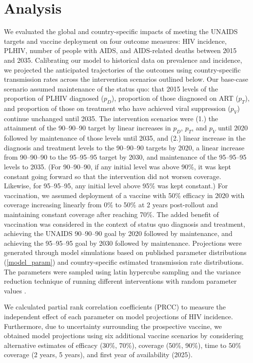 \documentclass[11pt]{article}
\begin{document}
\section{Analysis}
We evaluated the global and country-specific impacts of meeting the
UNAIDS targets and vaccine deployment on four outcome measures: HIV
incidence, PLHIV, number of people with AIDS, and AIDS-related deaths
between 2015 and 2035. Calibrating our model to historical data on
prevalence and incidence, we projected the anticipated trajectories of
the outcomes using country-specific transmission rates across the
intervention scenarios outlined below.  Our base-case scenario assumed
maintenance of the status quo: that 2015 levels of the proportion of
PLHIV diagnosed ($p_{D}$), proportion of those diagnosed on ART
($p_{T}$), and proportion of those on treatment who have achieved
viral suppression ($p_{V}$) continue unchanged until 2035.  The
intervention scenarios were (1.) the attainment of the 90--90--90
target by linear increases in $p_{D}$, $p_{T}$, and $p_{V}$ until 2020
followed by maintenance of those levels until 2035, and (2.) linear
increase in the diagnosis and treatment levels to the 90--90--90
targets by 2020, a linear increase from 90--90--90 to the 95--95--95
target by 2030, and maintenance of the 95--95--95 levels to 2035. (For
90--90--90, if any initial level was above 90\%, it was kept constant
going forward so that the intervention did not worsen coverage.
Likewise, for 95--95--95, any initial level above 95\% was kept
constant.)  For vaccination, we assumed deployment of a vaccine with
50\% efficacy in 2020 with coverage increasing linearly from 0\% to
50\% at 2 years post-rollout and maintaining constant coverage after
reaching 70\%. The added benefit of vaccination was considered in the
context of status quo diagnosis and treatment, achieving the UNAIDS
90–90–90 goal by 2020 followed by maintenance, and achieving the
95–95–95 goal by 2030 followed by maintenance.  Projections were
generated through model simulations based on published parameter
distributions (\autoref{model_param}) and country-specific estimated
transmission rate distributions. The parameters were sampled using
latin hypercube sampling \cite{} and the variance reduction technique
of running different interventions with random parameter values
\cite{}.

We calculated partial rank correlation coefficients (PRCC) to measure
the independent effect of each parameter on model projections of HIV
incidence. Furthermore, due to uncertainty surrounding the prospective
vaccine, we obtained model projections using six additional vaccine
scenarios by considering alternative estimates of efficacy (30\%,
70\%), coverage (50\%, 90\%), time to 50\% coverage (2 years, 5
years), and first year of availability (2025).
\end{document}
